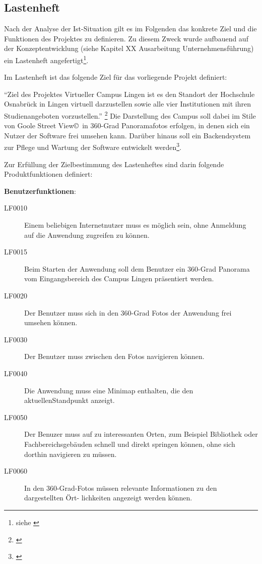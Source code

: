 \subsection{Lastenheft}
\label{sec:Lastenheft}

Nach der Analyse der Ist-Situation gilt es im Folgenden das konkrete Ziel und die Funktionen des Projektes zu definieren. 
Zu diesem Zweck wurde aufbauend auf der Konzeptentwicklung (siehe Kapitel XX Ausarbeitung Unternehmensführung) ein 
Lastenheft angefertigt\footnote{siehe \citet{lastenheft2013}}.

Im Lastenheft ist das folgende Ziel für das vorliegende Projekt definiert:

"`Ziel des Projektes Virtueller Campus Lingen ist es den Standort der Hochschule Osnabrück
in Lingen virtuell darzustellen sowie alle vier Institutionen mit ihren Studienangeboten
vorzustellen."' \footnote{\citet{lastenheft2013}}
Die Darstellung des Campus soll dabei im Stile von Goole Street View\copyright\ in 360-Grad Panoramafotos erfolgen, in 
denen sich ein Nutzer der Software frei umsehen kann. Darüber hinaus soll ein Backendsystem zur Pflege und Wartung der 
Software entwickelt werden\footnote{\citet{lastenheft2013}}.

Zur Erfüllung der Zielbestimmung des Lastenheftes sind darin folgende Produktfunktionen definiert:

\textbf{Benutzerfunktionen}:

\begin{description}
  \item[LF0010] Einem beliebigen Internetnutzer muss es möglich sein, ohne Anmeldung auf die
  Anwendung zugreifen zu können.
  \item[LF0015] Beim Starten der Anwendung soll dem Benutzer ein 360-Grad Panorama vom
  Eingangsbereich des Campus Lingen präsentiert werden.
  \item[LF0020] Der Benutzer muss sich in den 360-Grad Fotos der Anwendung frei umsehen
  können.
  \item[LF0030] Der Benutzer muss zwischen den Fotos navigieren können.
  \item[LF0040] Die Anwendung muss eine Minimap enthalten, die den aktuellenStandpunkt anzeigt.
  \item[LF0050] Der Benuzer muss auf zu interessanten Orten, zum Beispiel Bibliothek oder Fachbereichsgebäuden schnell und direkt springen können, ohne sich dorthin navigieren zu müssen.
  \item[LF0060] In den 360-Grad-Fotos müssen relevante Informationen zu den dargestellten Ört-
  lichkeiten angezeigt werden können.
\end{description}

